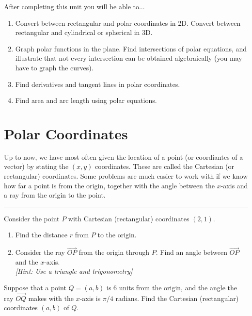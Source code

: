 
\noindent 
After completing this unit you will be able to...
\begin{enumerate}

\item Convert between rectangular and polar coordinates in 2D. Convert between rectangular and cylindrical or spherical in 3D.
\item Graph polar functions in the plane. Find intersections of polar equations, and illustrate that not every intersection can be obtained algebraically (you may have to graph the curves).
\item Find derivatives and tangent lines in polar coordinates.
\item Find area and arc length using polar equations.

\end{enumerate}

\section{Polar Coordinates}
Up to now, we have most often given the location of a point (or coordiantes of a vector) by stating the $(x,y)$ coordinates.  These are called the Cartesian (or rectangular) coordinates.  Some problems are much easier to work with if we know how far a point is from the origin, together with the angle between the $x$-axis and a ray from the origin to the point.

\hrule

\begin{problem}
%
Consider the point $P$ with Cartesian (rectangular) coordinates $(2,1)$.
\begin{enumerate}
\item Find the distance $r$ from $P$ to the origin. 
\item Consider the ray $\vec {OP}$ from the origin through $P$. Find an angle between $\vec{OP}$ and the $x$-axis.\\
\textit{[Hint: Use a triangle and trigonometry]}
\end{enumerate}

\end{problem}
\begin{problem}
Suppose that a point $Q=(a,b)$ is 6 units from the origin, and the angle the ray $\vec{OQ}$ makes with the $x$-axis is $\pi/4$ radians.  Find the Cartesian (rectangular) coordinates $(a,b)$ of $Q$.
\end{problem}

